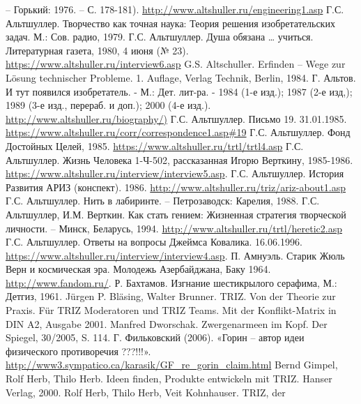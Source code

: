\begin{thebibliography}{xxx}
  -- Горький: 1976. -- С. 178-181).
  \url{http://www.altshuller.ru/engineering1.asp}
 Г.С. Альтшуллер. Творчество как точная наука: Теория
  решения изобретательских задач. М.: Сов. радио, 1979.
 Г.С. Альтшуллер. Душа обязана …  учиться.
  Литературная газета, 1980, 4 июня (№ 23).
  \url{https://www.altshuller.ru/interview6.asp}
 G.S. Altschuller. Erfinden -- Wege zur Lösung
  technischer Probleme. 1. Auflage, Verlag Technik, Berlin, 1984.
 Г. Альтов. И тут появился изобретатель.  - М.:
  Дет. лит-ра. - 1984 (1-е изд.); 1987 (2-е изд,); 1989 (3-е изд., перераб. и
  доп.); 2000 (4-е изд.).  \url{http://www.altshuller.ru/biography/)}
 Г.С. Альтшуллер. Письмо 19.  31.01.1985.
  \url{https://www.altshuller.ru/corr/correspondence1.asp#19}
 Г.С. Альтшуллер. Фонд Достойных Целей, 1985.
  \url{https://www.altshuller.ru/trtl/trtl4.asp}
 Г.С. Альтшуллер. Жизнь Человека 1-Ч-502, рассказанная
  Игорю Верткину, 1985-1986.
  \url{https://www.altshuller.ru/interview/interview5.asp}.
 Г.С. Альтшуллер.  История Развития АРИЗ (конспект).
  1986.  \url{http://www.altshuller.ru/triz/ariz-about1.asp}
 Г.С. Альтшуллер. Нить в лабиринте. -- Петрозаводск:
  Карелия, 1988. 
 Г.С. Альтшуллер, И.М. Верткин. Как стать гением:
  Жизненная стратегия творческой личности. -- Минск, Беларусь, 1994.
  \url{http://www.altshuller.ru/trtl/heretic2.asp}
 Г.С. Альтшуллер. Ответы на вопросы Джеймса Ковалика.
  16.06.1996.  \url{https://www.altshuller.ru/interview/interview4.asp}.
 П. Амнуэль. Старик Жюль Верн и космическая эра. Молодежь
  Азербайджана, Баку 1964.  \url{http://www.fandom.ru/}.
 Р. Бахтамов. Изгнание шестикрылого серафима, М.:
  Детгиз, 1961.  
 Jürgen P. Bläsing, Walter Brunner. TRIZ. Von der
  Theorie zur Praxis. Für TRIZ Moderatoren und TRIZ Teams. Mit der
  Konflikt-Matrix in DIN A2, Ausgabe 2001.
 Manfred Dworschak. Zwergenarmeen im Kopf. Der
  Spiegel, 30/2005, S. 114.
 Г. Фильковский (2006). «Горин -- автор идеи
  физического противоречия ???!!!».
  \url{http://www3.sympatico.ca/karasik/GF_re_gorin_claim.html}
 Bernd Gimpel, Rolf Herb, Thilo Herb. Ideen finden,
  Produkte entwickeln mit TRIZ. Hanser Verlag, 2000.
 Rolf Herb, Thilo Herb, Veit Kohnhauser. TRIZ, der

\end{thebibliography}
